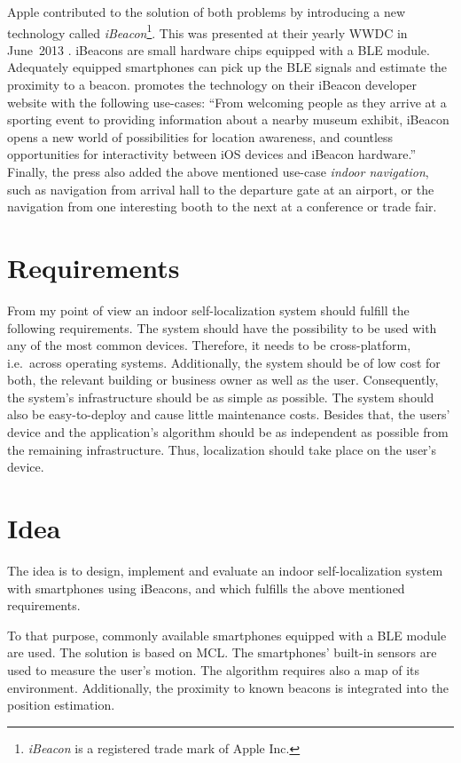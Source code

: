 Apple contributed to the solution of both problems by introducing a new technology called \emph{iBeacon}\footnote{\emph{iBeacon} is a registered trade mark of Apple Inc.}. This was presented at their yearly \ac{WWDC} in June~2013 \citep{apple:wwdc_2013_bruins}. iBeacons are small hardware chips equipped with a \ac{BLE} module. Adequately equipped smartphones can pick up the \ac{BLE} signals and estimate the proximity to a beacon. \citet{apple:ibeacon_site} promotes the technology on their iBeacon developer website with the following use-cases: ``From welcoming people as they arrive at a sporting event to providing information about a nearby museum exhibit, iBeacon opens a new world of possibilities for location awareness, and countless opportunities for interactivity between iOS devices and iBeacon hardware.'' Finally, the press also added the above mentioned use-case \emph{indoor navigation}, such as navigation from arrival hall to the departure gate at an airport, or the navigation from one interesting booth to the next at a conference or trade fair.


\section{Requirements}
From my point of view an indoor self-localization system should fulfill the following requirements. The system should have the possibility to be used with any of the most common devices. Therefore, it needs to be cross-platform, i.e.\ across operating systems. Additionally, the system should be of low cost for both, the relevant building or business owner as well as the user. Consequently, the system’s infrastructure should be as simple as possible. The system should also be easy-to-deploy and cause little maintenance costs. Besides that, the users’ device and the application's algorithm should be as independent as possible from the remaining infrastructure. Thus, localization should take place on the user’s device.


\section{Idea}
The idea is to design, implement and evaluate an indoor self-localization system with smartphones using iBeacons, and which fulfills the above mentioned requirements.

To that purpose, commonly available smartphones equipped with a \ac{BLE} module are used. The solution is based on \ac{MCL}. The smartphones' built-in sensors are used to measure the user's motion. The algorithm requires also a map of its environment. Additionally, the proximity to known beacons is integrated into the position estimation.

